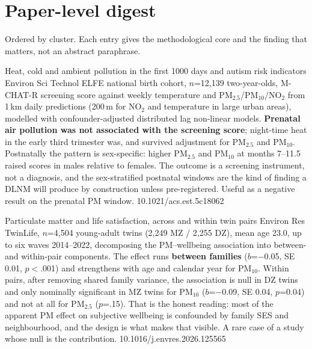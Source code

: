 \documentclass[10pt]{article}
\begin{document}
\clearpage

\section*{\sffamily\bfseries\color{Deep}Paper-level digest}
\vspace{-1.5mm}{\color{Amber}\rule{\linewidth}{1.1pt}}\vspace{1mm}

{\fontsize{7.4}{9}\selectfont\color{Slate}Ordered by cluster. Each entry gives the
methodological core and the finding that matters, not an abstract paraphrase.\par}


{Heat, cold and ambient pollution in the first 1000 days and autism risk indicators}
{Environ Sci Technol}
{ELFE national birth cohort, $n$=12{,}139 two-year-olds, M-CHAT-R screening score against
weekly temperature and PM$_{2.5}$/PM$_{10}$/NO$_2$ from 1\,km daily predictions (200\,m
for NO$_2$ and temperature in large urban areas), modelled with confounder-adjusted
distributed lag non-linear models. \textbf{Prenatal air pollution was not associated with
the screening score}; night-time heat in the early third trimester was, and survived
adjustment for PM$_{2.5}$ and PM$_{10}$. Postnatally the pattern is sex-specific: higher
PM$_{2.5}$ and PM$_{10}$ at months 7--11.5 raised scores in males relative to females.
The outcome is a screening instrument, not a diagnosis, and the sex-stratified postnatal
windows are the kind of finding a DLNM will produce by construction unless
pre-registered. Useful as a negative result on the prenatal PM window.}
{10.1021/acs.est.5c18062}

{Particulate matter and life satisfaction, across and within twin pairs}
{Environ Res}
{TwinLife, $n$=4{,}504 young-adult twins (2{,}249 MZ / 2{,}255 DZ), mean age 23.0, up to
six waves 2014--2022, decomposing the PM--wellbeing association into between- and
within-pair components. The effect runs \textbf{between families} ($b$=$-$0.05,
SE 0.01, $p<$.001) and strengthens with age and calendar year for PM$_{10}$. Within
pairs, after removing shared family variance, the association is null in DZ twins and
only nominally significant in MZ twins for PM$_{10}$ ($b$=$-$0.09, SE 0.04, $p$=0.04)
and not at all for PM$_{2.5}$ ($p$=.15). That is the honest reading: most of the apparent
PM effect on subjective wellbeing is confounded by family SES and neighbourhood, and the
design is what makes that visible. A rare case of a study whose null is the contribution.}
{10.1016/j.envres.2026.125565}
\end{document}
